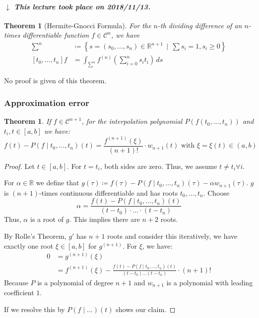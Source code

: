 \documentclass[a4paper]{article}
\newcounter{lecref}[section]
\numberwithin{lecref}{section}
\theoremstyle{break}
\newtheorem{thm}[lecref]{Theorem}
\newcommand{\dateref}[1]{%
  \begin{mdframed}[backgroundcolor=gray!10,innerbottommargin=0pt,innertopmargin=0pt]
    \paragraph{\textit{$\downarrow$ This lecture took place on #1.}}%
  \end{mdframed}%
}
\newcommand{\SetDef}[2]{\left\{#1\,\mid\,#2\right\}}
\begin{document}
\dateref{2018/11/13}

\begin{thm}[Hermite-Gnocci Formula]
  \label{theorem:4-12}
  For the $n$-th dividing difference of an $n$-times differentiable function $f \in \mathcal C^n$, we have
  \begin{align*}
    \sum^n &\coloneqq \SetDef{s = (s_0, \dots, s_n) \in \mathbb R^{n+1}}{\sum s_i = 1, s_i \geq 0} \\
    [t_0, \dots, t_n] f &= \int_{\sum^n} f^{(n)} \left(\sum_{i=0}^n s_i t_i\right) \, ds
  \end{align*}
\end{thm}

No proof is given of this theorem.

\subsubsection{Approximation error}

\begin{thm}
  \label{theorem:4-13}
  If $f \in \mathcal C^{n+1}$, for the interpolation polynomial $P(f(t_0, \dots, t_n))$ and $t_i, t \in [a,b]$ we have:
  \[ f(t) - P(f \mid t_0, \dots, t_n)(t) = \frac{f^{(n+1)}(\xi)}{(n+1)!} \cdot w_{n+1}(t) \text{ with } \xi = \xi(t) \in (a,b) \]
\end{thm}

\begin{proof}
  Let $t \in [a,b]$. For $t = t_i$, both sides are zero. Thus, we assume $t \neq t_i \forall i$.

  For $\alpha \in \mathbb R$ we define that $g(\tau) \coloneqq f(\tau) - P(f \mid t_0, \dots, t_n)(\tau) - \alpha w_{n+1}(\tau)$.
  $g$ is $(n+1)$-times continuous differentiable and has roots $t_0, \dots, t_n$. Choose
  \[ \alpha = \frac{f(t) - P(f \mid t_0, \dots, t_n)(t)}{(t - t_0) \cdot \dots \cdot (t - t_n)} \]
  Thus, $\alpha$ is a root of $g$. This implies there are $n+2$ roots.

  By Rolle's Theorem, $g'$ has $n+1$ roots and consider this iteratively, we have exactly one root $\xi \in [a,b]$ for $g^{(n+1)}$.
  For $\xi$, we have:
  \begin{align*}
    0 &= g^{(n+1)}(\xi) \\
      &= f^{(n+1)}(\xi) - \frac{f(t) - P(f \mid t_0, \dots, t_n)(t)}{(t - t_0) \dots (t - t_n)} \cdot (n+1)!
  \end{align*}
  Because $P$ is a polynomial of degree $n+1$ and $w_{n+1}$ is a polynomial with leading coefficient $1$.

  If we resolve this by $P(f\mid\dots)(t)$ shows our claim.
\end{proof}
\end{document}
